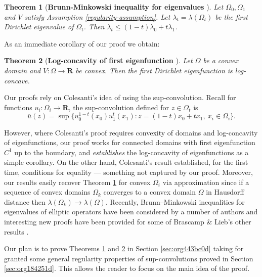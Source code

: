 \documentclass[12pt]{amsart}
\newtheorem{thm}{Theorem}[section]
\theoremstyle{definition}
\theoremstyle{remark}
\begin{document}
\begin{thm}[{\textbf{Brunn-Minkowski inequality for
eigenvalues} \cite[Theorem 6.2]{zbMATH03522267}}]
  \label{org5c5abe2} Let $\Omega_0,\Omega_1$ and $V$ satisfy Assumption \ref{regularity-assumption}. Let \(\lambda_t = \lambda(\Omega_t)\) be the
first Dirichlet eigenvalue of \(\Omega_t\). Then $\lambda_t \leq (1-t)\lambda_0 + t \lambda_1$.
\end{thm}

As an immediate corollary of our proof we obtain:

\begin{thm}[{\textbf{Log-concavity of first eigenfunction} \cite[Theorem 6.1]{zbMATH03522267}}]
  \label{thm:log-concave} Let $\Omega$ be a convex domain and $V:\Omega \rightarrow \mathbf{R}$ be
convex. Then the first Dirichlet eigenfunction is log-concave.
\end{thm}

Our proofs rely on
Colesanti's \cite{zbMATH02181983} idea of using the sup-convolution. Recall for functions \(u_i : \Omega_i \to \mathbf{R}\), the sup-convolution defined for \(z \in \Omega_t\) is
\begin{equation}
  \label{eq:sup-conv-def} \overline{u}(z) =
\sup\{u_0^{1-t}(x_0)u_1^t(x_1) : z = (1-t)x_0 + tx_1, \> x_i \in \Omega_i\}.
\end{equation}

However, where Colesanti's proof requires convexity of domains and log-concavity
of eigenfunctions, our proof works for connected domains with first eigenfunction $C^1$ up to the boundary, and
\textit{establishes} the log-concavity of eigenfunctions as a simple
corollary. On the other hand, Colesanti's result established, for the first
time, conditions for equality --- something not captured by our proof. Moreover, our results easily recover Theorem \ref{org5c5abe2} for convex $\Omega_i$ via approximation since if a sequence of convex domains $\Omega_k$ converges
to a convex domain $\Omega$ in Hausdorff distance then $\lambda(\Omega_k) \rightarrow \lambda(\Omega)$. Recently, Brunn--Minkowski inequalities for eigenvalues of elliptic operators have been considered by a number of authors \cite{MR2141854,MR2673741,MR4024953} and interesting new proofs have been provided for some of Brascamp \& Lieb's other results   \cite{MR4958493}.

Our plan is to prove  Theorems \ref{org5c5abe2} and \ref{thm:log-concave} in Section \ref{sec:org443bc0d} taking for granted some general regularity properties of sup-convolutions proved in Section \ref{sec:org184251d}. This allows the reader to  focus on the main idea of the proof.
\end{document}
